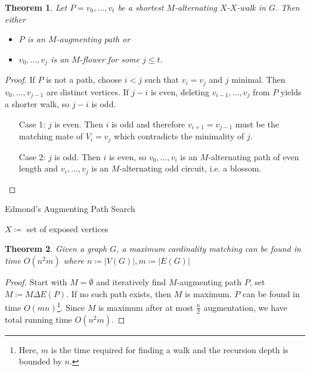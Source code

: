 \documentclass[11pt, a4paper]{article}
\newcommand{\abs}[1]{\left\lvert#1\right\rvert}
\newtheorem{theorem}{Theorem}[section]
\theoremstyle{remark}
\theoremstyle{definition}
\begin{document}
\begin{theorem}\label{thm:augmenting-path-blossom}
Let $P=v_0,\ldots,v_t$ be a shortest $M$-alternating $X$-$X$-walk in $G$.
Then either
\begin{itemize}
	\item $P$ is an $M$-augmenting path \emph{or}
	\item $v_0,\ldots,v_j$ is an $M$-flower for some $j\leq t$.
\end{itemize}
\end{theorem}
\begin{proof}
If $P$ is not a path, choose $i<j$ such that $v_i=v_j$ and $j$ minimal.
Then $v_0,\ldots,v_{j-1}$ are distinct vertices. If $j-i$ is even,
deleting $v_{i-1},\ldots,v_j$ from $P$ yields a shorter walk, so $j-i$
is odd.
\begin{enumerate}
\item[Case 1:] $j$ is even. Then $i$ is odd and therefore $v_{i+1}=v_{j-1}$
must be the matching mate of $V_i=v_j$ which contradicts the minimality of
$j$.
\item[Case 2:] $j$ is odd. Then $i$ is even, so $v_0,\ldots,v_i$ is an
$M$-alternating path of even length and $v_i,\ldots,v_j$ is an
$M$-alternating odd circuit, i.e. a blossom.
\end{enumerate}
\end{proof}

\begin{algorithm}
\caption{Edmond's Augmenting Path Search}
$X\coloneqq$ set of exposed vertices\;
\end{algorithm}

\begin{theorem}
Given a graph $G$, a maximum cardinality matching can be found in time
$O(n^2m)$ where $n\coloneqq\abs{V(G)}, m\coloneqq\abs{E(G)}$
\end{theorem}
\begin{proof}
Start with $M=\emptyset$ and iteratively find $M$-augmenting path $P$,
set $M\coloneqq M\Delta E(P)$. If no such path exists, then $M$ is
maximum. $P$ can be found in time $O(mn)$\footnote{
	Here, $m$ is the time required for finding a walk and the recursion
	depth is bounded by $n$.
}. Since $M$ is maximum after at most $\frac{n}{2}$ augmentation, we have
total running time $O(n^2m)$.
\end{proof}
\end{document}
